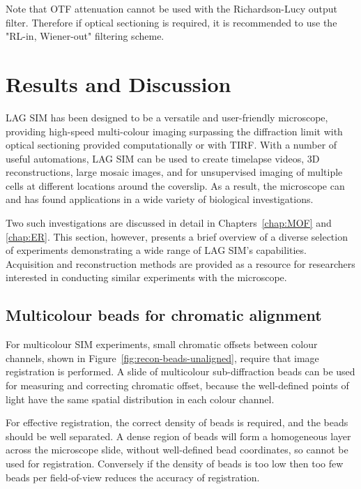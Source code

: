 Note that OTF attenuation cannot be used with the Richardson-Lucy output filter. 
Therefore if optical sectioning is required, it is recommended to use the "RL-in, Wiener-out" filtering scheme. 


\section{Results and Discussion} \label{sec:sim-showcase}
LAG SIM has been designed to be a versatile and user-friendly microscope, providing high-speed multi-colour imaging surpassing the diffraction limit with optical sectioning provided computationally or with TIRF. 
With a number of useful automations, LAG SIM can be used to create timelapse videos, 3D reconstructions, large mosaic images, and for unsupervised imaging of multiple cells at different locations around the coverslip. 
As a result, the microscope can and has found applications in a wide variety of biological investigations.

Two such investigations are discussed in detail in Chapters~\ref{chap:MOF} and \ref{chap:ER}. 
This section, however, presents a brief overview of a diverse selection of experiments demonstrating a wide range of LAG SIM's capabilities. 
Acquisition and reconstruction methods are provided as a resource for researchers interested in conducting similar experiments with the microscope. 

\subsection{Multicolour beads for chromatic alignment}
For multicolour SIM experiments, small chromatic offsets between colour channels, shown in Figure~\ref{fig:recon-beads-unaligned}, require that image registration is performed. 
A slide of multicolour sub-diffraction beads can be used for measuring and correcting chromatic offset, because the well-defined points of light have the same spatial distribution in each colour channel. 

For effective registration, the correct density of beads is required, and the beads should be well separated. 
A dense region of beads will form a homogeneous layer across the microscope slide, without well-defined bead coordinates, so cannot be used for registration. 
Conversely if the density of beads is too low then too few beads per field-of-view reduces the accuracy of registration. 

